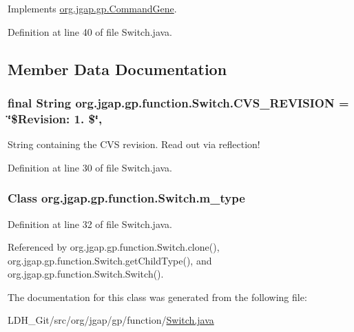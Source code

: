 Implements \hyperlink{classorg_1_1jgap_1_1gp_1_1_command_gene_a236141d99059da808afe7a9217e411c7}{org.\-jgap.\-gp.\-Command\-Gene}.



Definition at line 40 of file Switch.\-java.



\subsection{Member Data Documentation}
\hypertarget{classorg_1_1jgap_1_1gp_1_1function_1_1_switch_aa9b7dd6ddaf13d26fe615565313844d6}{
\subsubsection[{C\-V\-S\-\_\-\-R\-E\-V\-I\-S\-I\-O\-N}]{\setlength{\rightskip}{0pt plus 5cm}final String org.\-jgap.\-gp.\-function.\-Switch.\-C\-V\-S\-\_\-\-R\-E\-V\-I\-S\-I\-O\-N = \char`\"{}\$Revision\-: 1. \$\char`\"{}\hspace{0.3cm}{\ttfamily [static]}, {\ttfamily [private]}}}\label{classorg_1_1jgap_1_1gp_1_1function_1_1_switch_aa9b7dd6ddaf13d26fe615565313844d6}
String containing the C\-V\-S revision. Read out via reflection! 

Definition at line 30 of file Switch.\-java.

\hypertarget{classorg_1_1jgap_1_1gp_1_1function_1_1_switch_a0a171b818c02eb9347b9cff967ce0e84}{
\subsubsection[{m\-\_\-type}]{\setlength{\rightskip}{0pt plus 5cm}Class org.\-jgap.\-gp.\-function.\-Switch.\-m\-\_\-type\hspace{0.3cm}{\ttfamily [private]}}}\label{classorg_1_1jgap_1_1gp_1_1function_1_1_switch_a0a171b818c02eb9347b9cff967ce0e84}


Definition at line 32 of file Switch.\-java.



Referenced by org.\-jgap.\-gp.\-function.\-Switch.\-clone(), org.\-jgap.\-gp.\-function.\-Switch.\-get\-Child\-Type(), and org.\-jgap.\-gp.\-function.\-Switch.\-Switch().



The documentation for this class was generated from the following file\-:\begin{DoxyCompactItemize}
\item 
L\-D\-H\-\_\-\-Git/src/org/jgap/gp/function/\hyperlink{_switch_8java}{Switch.\-java}\end{DoxyCompactItemize}
